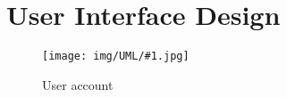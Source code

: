 \documentclass[../DD0.tex]{subfiles}
\begin{document}
\newcommand{\fetchUML}[4] {

  \begin{figure}[h!]

    \centering
    \hspace*{-#4cm}
    \texttt{[image: img/UML/\#1.jpg]}
    \caption{#2}
    \label{fig:#1}

  \end{figure}

}

\section {User Interface Design}

\label{sec:userdes}

    \fetchUML
      {User}
      {User account}
      {1}           %
      {0}           %

  \clearpage

%


\end{document}
